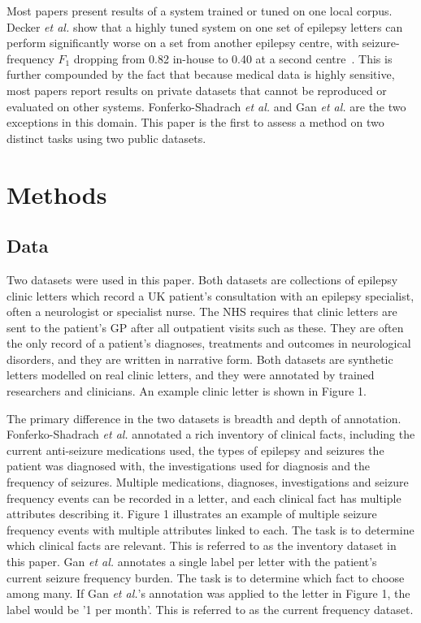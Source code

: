 \documentclass[conference]{IEEEtran}
\begin{document}
Most papers present results of a system trained or tuned on 
one local corpus. Decker \emph{et al.} show that a highly 
tuned system on one set of epilepsy letters can perform 
significantly worse on a set from another epilepsy centre, 
with seizure-frequency $F_1$ dropping from 0.82 in-house 
to 0.40 at a second centre~\cite{b12}. This is further 
compounded by the fact that because medical data is highly
sensitive, most papers report results on private datasets 
that cannot be reproduced or evaluated on other systems. 
Fonferko-Shadrach \emph{et al.} and Gan \emph{et al.} 
are the two exceptions in this domain. This paper is the
first to assess a method on two distinct tasks using two
public datasets. 

\section{Methods}
\subsection{Data}

Two datasets were used in this paper. Both datasets
are collections of epilepsy clinic letters which record 
a UK patient's consultation with an epilepsy specialist, 
often a neurologist or specialist nurse. \cite{b2,b3} 
The NHS requires that clinic letters are sent to the 
patient's GP after all outpatient visits such as these. \cite{b13} 
They are often the only record of a patient's diagnoses,
treatments and outcomes in neurological disorders, 
and they are written in narrative form. Both datasets 
are synthetic letters modelled on real clinic letters, 
and they were annotated by trained researchers and 
clinicians. An example clinic letter is shown in Figure 1.

The primary difference in the two datasets is breadth
and depth of annotation. Fonferko-Shadrach \emph{et al.}
annotated a rich inventory of clinical facts, including the
current anti-seizure medications used, the types of epilepsy 
and seizures the patient was diagnosed with, the 
investigations used for diagnosis and the frequency of 
seizures. Multiple medications, diagnoses, investigations
and seizure frequency events can be recorded in a letter,
and each clinical fact has multiple attributes describing it. 
Figure 1 illustrates an example of multiple seizure frequency
events with multiple attributes linked to each. The task is 
to determine which clinical facts are relevant. This is referred 
to as the inventory dataset in this paper. Gan \emph{et al.} 
annotates a single label per letter with the patient's current
seizure frequency burden. The task is to determine which
fact to choose among many. If Gan \emph{et al.}'s annotation
was applied to the letter in Figure 1, the label would be '1 
per month'. This is referred to as the current frequency 
dataset.
\end{document}

